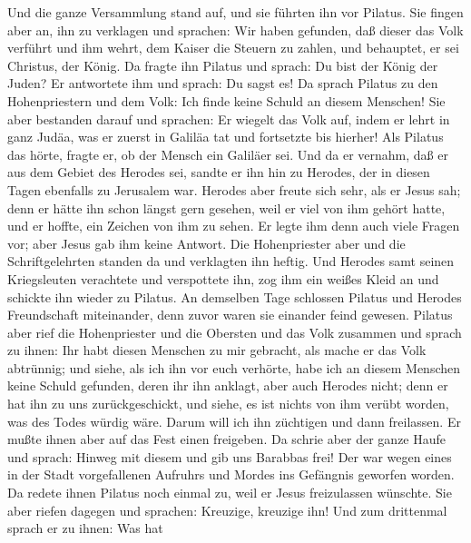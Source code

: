  Und die ganze Versammlung stand auf, und sie führten ihn
vor Pilatus.  Sie fingen aber an, ihn zu verklagen und
sprachen: Wir haben gefunden, daß dieser das Volk verführt und ihm
wehrt, dem Kaiser die Steuern zu zahlen, und behauptet, er sei Christus,
der König.  Da fragte ihn Pilatus und sprach: Du bist der
König der Juden? Er antwortete ihm und sprach: Du sagst es!
 Da sprach Pilatus zu den Hohenpriestern und dem Volk: Ich
finde keine Schuld an diesem Menschen!  Sie aber bestanden
darauf und sprachen: Er wiegelt das Volk auf, indem er lehrt in ganz
Judäa, was er zuerst in Galiläa tat und fortsetzte bis hierher!
 Als Pilatus das hörte, fragte er, ob der Mensch ein
Galiläer sei.  Und da er vernahm, daß er aus dem Gebiet
des Herodes sei, sandte er ihn hin zu Herodes, der in diesen Tagen
ebenfalls zu Jerusalem war.  Herodes aber freute sich
sehr, als er Jesus sah; denn er hätte ihn schon längst gern gesehen,
weil er viel von ihm gehört hatte, und er hoffte, ein Zeichen von ihm zu
sehen.  Er legte ihm denn auch viele Fragen vor; aber
Jesus gab ihm keine Antwort.  Die Hohenpriester aber und
die Schriftgelehrten standen da und verklagten ihn heftig.
 Und Herodes samt seinen Kriegsleuten verachtete und
verspottete ihn, zog ihm ein weißes Kleid an und schickte ihn wieder zu
Pilatus.  An demselben Tage schlossen Pilatus und Herodes
Freundschaft miteinander, denn zuvor waren sie einander feind gewesen.
 Pilatus aber rief die Hohenpriester und die Obersten und
das Volk zusammen  und sprach zu ihnen: Ihr habt diesen
Menschen zu mir gebracht, als mache er das Volk abtrünnig; und siehe,
als ich ihn vor euch verhörte, habe ich an diesem Menschen keine Schuld
gefunden, deren ihr ihn anklagt,  aber auch Herodes
nicht; denn er hat ihn zu uns zurückgeschickt, und siehe, es ist nichts
von ihm verübt worden, was des Todes würdig wäre.  Darum
will ich ihn züchtigen und dann freilassen.  Er mußte
ihnen aber auf das Fest einen freigeben.  Da schrie aber
der ganze Haufe und sprach: Hinweg mit diesem und gib uns Barabbas frei!
 Der war wegen eines in der Stadt vorgefallenen Aufruhrs
und Mordes ins Gefängnis geworfen worden.  Da redete
ihnen Pilatus noch einmal zu, weil er Jesus freizulassen wünschte.
 Sie aber riefen dagegen und sprachen: Kreuzige, kreuzige
ihn!  Und zum drittenmal sprach er zu ihnen: Was hat
